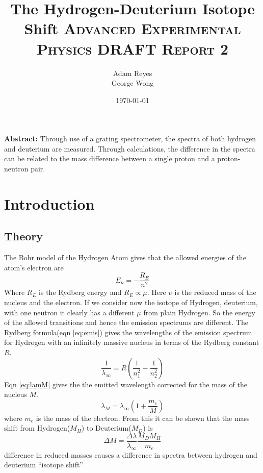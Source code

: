 \documentclass[paper=a4, fontsize=11pt]{scrartcl} %
\title{	
The Hydrogen-Deuterium Isotope Shift
\horrule{0.5pt}
\normalfont \normalsize 
\textsc{Advanced Experimental Physics DRAFT Report 2 }
}
\author{Adam Reyes \\ George Wong} %
\date{\normalsize\today} %
\numberwithin{equation}{section}
\numberwithin{figure}{section}
\numberwithin{table}{section}
\begin{document}
\maketitle



\textbf{Abstract:}
Through use of a grating spectrometer, the spectra of both hydrogen and deuterium are measured. Through calculations, the difference in the spectra can be related to the mass difference between a single proton and a proton-neutron pair.

\section{Introduction}

\subsection{Theory}

The Bohr model of the Hydrogen Atom gives that the allowed energies of
the atom's electron are
\begin{equation}
\label{eq:Hen}
E_n = -\frac{R_E}{n^2}
\end{equation}
Where $R_E$ is the Rydberg energy and $R_E \propto \mu$. Here
$\upsilon$ is the reduced mass of the nucleus and the electron. If we
consider now the isotope of Hydrogen, deuterium, with one neutron it
clearly has a different $\mu$ from plain Hydrogen. So the energy of
the allowed transitions and hence the emission spectrums are
different. The Rydberg formula(eqn \ref{eq:emis}) gives the wavelengths of the emission
spectrum for Hydrogen with an infinitely massive nucleus in terms of
the Rydberg constant $R$.
\begin{equation}
\label{eq:emis}
\frac{1}{\lambda_\infty} = R(\frac{1}{n_1 ^2}-\frac{1}{n_2 ^2})
\end{equation}
Eqn \ref{eq:lamM} gives the the emitted wavelength corrected for the
mass of the nucleus $M$.
\begin{equation}\label{eq:lamM}
\lambda_M = \lambda_{\infty} (1 + \frac{m_e}{M})
\end{equation}
where $m_e$ is the mass of the electron. From this it can be shown
that the mass shift from Hydrogen($M_H$) to Deuterium($M_D$) is
\begin{equation}
\label{eq:mass-shift}
\Delta M = \frac{\Delta \lambda}{\lambda_\infty}\frac{M_D M_H}{m_e}
\end{equation}
difference in reduced masses causes a difference in spectra between hydrogen and deuterium ``isotope shift''
\end{document}
